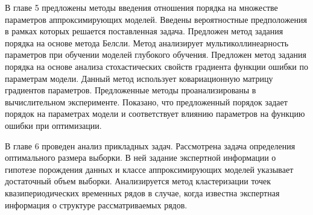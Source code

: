 В главе 5 предложены методы введения отношения порядка на множестве параметров аппроксимирующих моделей. Введены вероятностные предположения в рамках которых решается поставленная задача. Предложен метод задания порядка на основе метода Белсли. Метод анализирует мультиколлинеарность параметров при обучении моделей глубокого обучения. Предложен метод задания порядка на основе анализа стохастических свойств градиента функции ошибки по параметрам модели. Данный метод использует ковариационную матрицу градиентов параметров. Предложенные методы проанализированы в вычислительном эксперименте. Показано, что предложенный порядок задает порядок на параметрах модели и соответствует влиянию параметров на функцию ошибки при оптимизации.

В главе 6 проведен анализ прикладных задач. Рассмотрена задача определения оптимального размера выборки. В ней задание экспертной информации о гипотезе порождения данных и классе аппроксимирующих моделей указывает достаточный объем выборки. Анализируется метод кластеризации точек квазипериодических временных рядов в случае, когда известна экспертная информация о структуре рассматриваемых рядов.